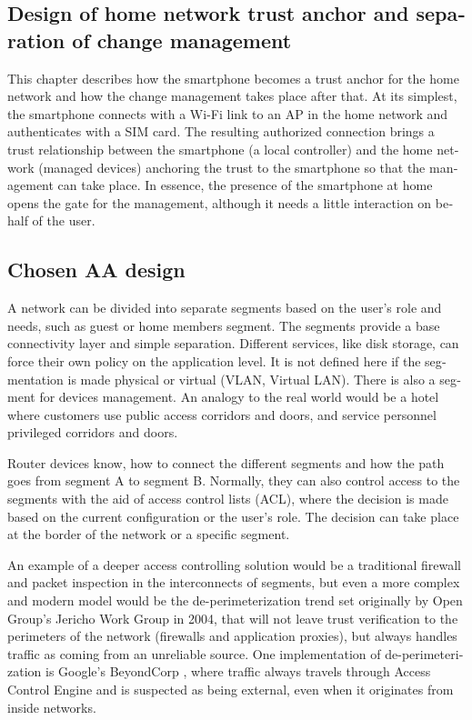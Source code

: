 \documentclass[12pt,a4paper,english]{tutthesis}
\begin{document}
\begin{otherlanguage}{english}
\chapter{Design of home network trust anchor and separation of change management}
\label{sec-4}





This chapter describes how the smartphone becomes a trust anchor for
the home network and how the change management takes place after that.
At its simplest, the smartphone connects with a Wi-Fi link to an
AP in the home network and authenticates with a SIM card.
The resulting authorized connection brings a trust relationship
between the smartphone (a local controller)
and the home network (managed devices) anchoring the trust to the smartphone so that the 
management can take place. 
In essence, the presence of the smartphone at home
opens the gate for the management, although it needs a little
interaction on behalf of the user.


\section{Chosen AA design}
\label{sec-4-1}
\label{sec:chosendesign}



A network can be divided into separate segments based on the user's role and
needs, such as guest or home members segment. The segments provide a
base connectivity layer and simple separation. Different services,
like disk storage, can force their own policy on the application level.
It is not defined here if the segmentation is made physical or
virtual (VLAN, Virtual LAN).  There is also a segment for devices
management.  An analogy to the real world would be a hotel where
customers use public access corridors and doors, and service personnel
privileged corridors and doors.


Router devices know, how to connect the different segments and how the
path goes from segment A to segment B. Normally, they can also control
access to the segments with the aid of access control lists (ACL), where
the decision is made based on the current configuration or the user's role.
The decision can take place at the border of the network or a specific segment.




An example of a deeper access controlling  solution would be a traditional firewall and packet
inspection in the interconnects of segments, but even a more complex and modern model
would be the de-perimeterization trend set originally by Open Group's
Jericho Work Group \cite{jericho2004} in 2004, that will not leave trust verification to
the perimeters of the network (firewalls and application proxies), but 
always handles traffic as coming from an unreliable source.
One implementation of de-perimeterization is 
Google's BeyondCorp \cite{2014-beyondcorp}, 
where traffic always travels through Access Control Engine
and is suspected as being external, even when it originates from
inside networks. 




\end{otherlanguage}
\end{document}
